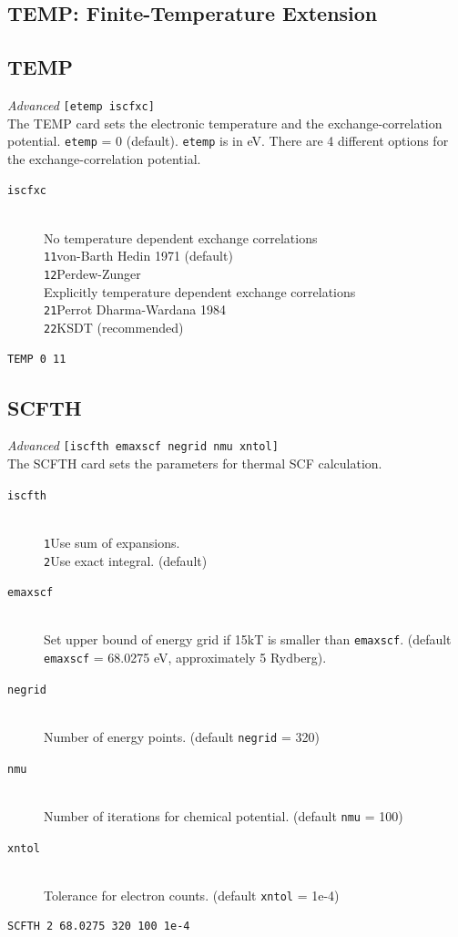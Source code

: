 \documentclass[11pt,oneside]{report} %
\newenvironment{Card}[4]%
      {\vspace{3ex}%
        \subsection{#1}
        \quad\textsl{#3}\newline
        \quad\texttt{#2}\newline%
        \label{card:#4}\\}
      {}
\begin{document}
\subsection{TEMP: Finite-Temperature Extension} 
\label{sec:Temp-modul}

\begin{Card}{TEMP}{[etemp iscfxc]}{Advanced}{tem}
The TEMP card sets the electronic temperature and the exchange-correlation potential. \texttt{etemp} = 0 (default). \texttt{etemp} is in eV. There are 4 different options for the exchange-correlation potential.

\begin{description}
\item[\texttt{iscfxc}]\hfill\\

No temperature dependent exchange correlations\hfill\\
\texttt{11}\quad von-Barth Hedin 1971 (default)\hfill\\ 
\texttt{12}\quad  Perdew-Zunger\hfill\\

Explicitly temperature dependent exchange correlations\hfill\\
\texttt{21}\quad  Perrot Dharma-Wardana 1984\hfill\\
\texttt{22}\quad  KSDT (recommended) 

\end{description}

\begin{verbatim}
TEMP 0 11 
\end{verbatim}
\end{Card}


\begin{Card}{SCFTH}{[iscfth emaxscf negrid nmu xntol]}{Advanced}{scf}
 The SCFTH card sets the parameters for thermal SCF calculation. 

\begin{description}
\item[\texttt{iscfth}]\hfill\\
\texttt{1}\quad Use sum of expansions. \hfill\\ 
\texttt{2}\quad Use exact integral. (default)
 
\item[\texttt{emaxscf}]\hfill\\Set upper bound of energy grid if 15kT is smaller than \texttt{emaxscf}. (default \texttt{emaxscf} = 68.0275 eV, approximately 5 Rydberg).
\item[\texttt{negrid}]\hfill\\Number of energy points. (default \texttt{negrid} = 320)
\item[\texttt{nmu}]\hfill\\Number of iterations for chemical potential. (default \texttt{nmu} = 100)
\item[\texttt{xntol}]\hfill\\Tolerance for electron counts. (default \texttt{xntol} = 1e-4)
\end{description}

\begin{verbatim}
SCFTH 2 68.0275 320 100 1e-4
\end{verbatim}
\end{Card}
\end{document}
